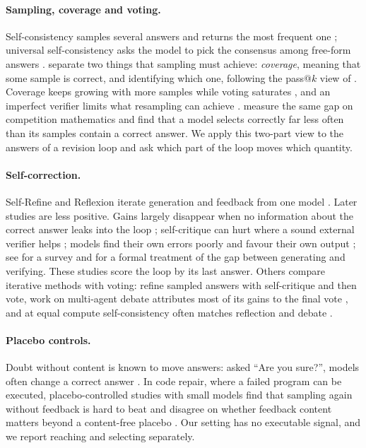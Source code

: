 \documentclass[11pt]{article}
\begin{document}
\paragraph{Sampling, coverage and voting.}
Self-consistency samples several answers and returns the most frequent one \citep{wang2023selfconsistency,aggarwal2023adaptive}; universal self-consistency asks the model to pick the consensus among free-form answers \citep{chen2023usc}.
\citet{brown2024monkeys} separate two things that sampling must achieve: \emph{coverage}, meaning that some sample is correct, and identifying which one, following the pass@$k$ view of \citet{chen2021codex}.
Coverage keeps growing with more samples while voting saturates \citep{chen2024morecalls}, and an imperfect verifier limits what resampling can achieve \citep{stroebl2024flaws}.
\citet{jain2026cliff} measure the same gap on competition mathematics and find that a model selects correctly far less often than its samples contain a correct answer.
We apply this two-part view to the answers of a revision loop and ask which part of the loop moves which quantity.

\paragraph{Self-correction.}
Self-Refine and Reflexion iterate generation and feedback from one model \citep{madaan2023selfrefine,shinn2023reflexion}.
Later studies are less positive.
Gains largely disappear when no information about the correct answer leaks into the loop \citep{huang2024cannot}; self-critique can hurt where a sound external verifier helps \citep{stechly2024selfverification}; models find their own errors poorly \citep{tyen2024cannot} and favour their own output \citep{xu2024pride}; see \citet{kamoi2024when} for a survey and \citet{song2024mindgap} for a formal treatment of the gap between generating and verifying.
These studies score the loop by its last answer.
Others compare iterative methods with voting: \citet{bilal2026refining} refine sampled answers with self-critique and then vote, work on multi-agent debate attributes most of its gains to the final vote \citep{smit2024mad,choi2025debate}, and at equal compute self-consistency often matches reflection and debate \citep{wang2024token}.

\paragraph{Placebo controls.}
Doubt without content is known to move answers: asked ``Are you sure?'', models often change a correct answer \citep{laban2024flipflop}.
In code repair, where a failed program can be executed, placebo-controlled studies with small models find that sampling again without feedback is hard to beat and disagree on whether feedback content matters beyond a content-free placebo \citep{iscan2026falsification,iscan2026form,verma2026blind}.
Our setting has no executable signal, and we report reaching and selecting separately.
\end{document}
